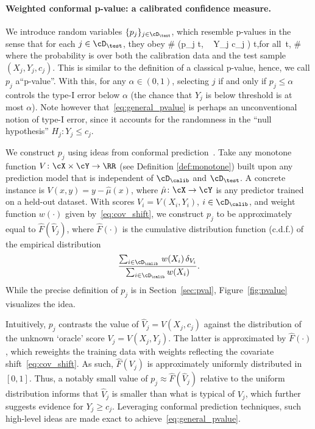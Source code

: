 \paragraph{Weighted conformal p-value: a calibrated confidence measure.}
We introduce random variables $\{p_j\}_{j\in \cD_\test}$, which resemble p-values in the sense that for each $j\in \cD_\test$, they obey
\#\label{eq:general_pvalue}
\PP(p_j \leq t, ~ Y_{j} \leq c_{j} ) \leq t,\quad \textrm{for all}~t\in [0,1],
\#
where the probability is over both the calibration data and the test sample
$(X_{j},Y_{j},c_{j})$.
This is similar to the definition of a classical p-value, hence, we call $p_j$ a``p-value''. With this, for any $\alpha\in(0,1)$, selecting $j$ if and only if $p_j\leq \alpha$
controls the type-I error below $\alpha$ (the chance that $Y_j$ is below threshold is at most $\alpha$).
Note however that~\eqref{eq:general_pvalue} is perhaps an unconventional notion of
type-I error, since it accounts for the randomness in the ``null hypothesis''
$H_{j}\colon Y_{j}\leq c_{j}$.


We construct $p_j$ using ideas from conformal prediction~\cite{vovk2005algorithmic,tibshirani2019conformal}.
Take any monotone
function $V\colon \cX\times\cY\to \RR$ (see Definition \ref{def:monotone})
built upon any prediction model that is independent of $\cD_\calib$ and
$\cD_\test$. A concrete instance is
$V(x,y) = y - \hat\mu(x)$, where $\hat\mu\colon \cX\to \cY$
is any predictor trained on a held-out dataset.
With scores $V_i = V(X_i,Y_i)$,  $i\in \cD_\calib$, and
weight function $w(\cdot)$ given by~\eqref{eq:cov_shift}, we construct $p_j$ to be approximately equal to  $\hat{F}(\hat{V}_j)$,
where  $\hat{F}(\cdot)$ is the cumulative distribution function (c.d.f.) of the empirical distribution
\[
\frac{ \sum_{i \in \cD_\calib} \,  w(X_i) \, \delta_{V_i} }{  \sum_{i \in \cD_\calib} w(X_i) }.
\]
While the precise definition of $p_j$ is in  Section~\ref{sec:pval}, Figure~\ref{fig:pvalue} visualizes the idea.

Intuitively, $p_j$ contrasts the value of $\hat{V}_{j}=V(X_{j},c_{j})$ against the distribution of the unknown `oracle' score $V_j=V(X_j,Y_j)$. The latter is
approximated by $\hat{F}(\cdot)$, which reweights the training data
with weights reflecting the covariate shift~\eqref{eq:cov_shift}. As such,
$\hat{F}(V_j)$ is approximately uniformly distributed in $[0,1]$.
Thus, a notably small value of $p_j\approx \hat{F}(\hat{V}_j)$ relative to the uniform distribution informs that $\hat{V}_j$ is smaller than what is typical of $V_j$, which further
suggests evidence for $Y_j\geq c_j$.
Leveraging conformal prediction techniques, such high-level ideas are made exact to achieve~\eqref{eq:general_pvalue}.


